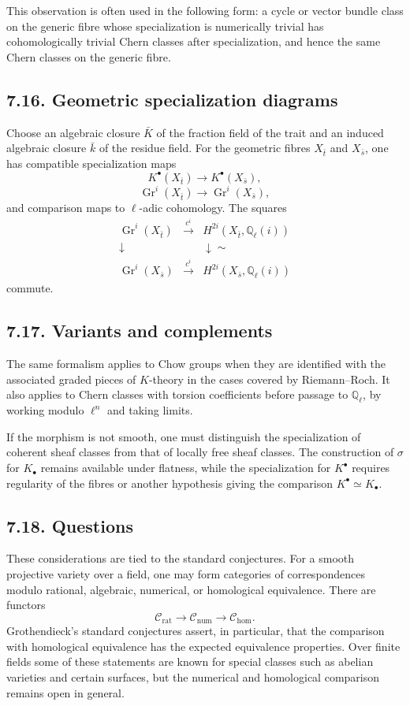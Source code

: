 \documentclass[12pt]{article}
\newcommand{\QQ}{\mathbb Q}
\newcommand{\Gr}{\operatorname{Gr}}
\newcommand{\xto}[1]{\xrightarrow{#1}}
\newcommand{\longto}{\longrightarrow}
\begin{document}
This observation is often used in the following form: a cycle or vector bundle class on the generic fibre whose specialization is numerically trivial has cohomologically trivial Chern classes after specialization, and hence the same Chern classes on the generic fibre.

\subsection*{7.16. Geometric specialization diagrams}

Choose an algebraic closure $\bar K$ of the fraction field of the trait and an induced algebraic closure $\bar k$ of the residue field. For the geometric fibres $X_{\bar t}$ and $X_{\bar s}$, one has compatible specialization maps
\[
K^\bullet(X_{\bar t})\longto K^\bullet(X_{\bar s}),
\]
\[
\Gr^i(X_{\bar t})\longto \Gr^i(X_{\bar s}),
\]
and comparison maps to $\ell$-adic cohomology. The squares
\[
\begin{array}{ccc}
\Gr^i(X_{\bar t})&\xto{\,c^i\,}&H^{2i}(X_{\bar t},\QQ_\ell(i))\\
\downarrow&&\downarrow\scriptstyle\sim\\
\Gr^i(X_{\bar s})&\xto{\,c^i\,}&H^{2i}(X_{\bar s},\QQ_\ell(i))
\end{array}
\]
commute.

\subsection*{7.17. Variants and complements}

The same formalism applies to Chow groups when they are identified with the associated graded pieces of $K$-theory in the cases covered by Riemann--Roch. It also applies to Chern classes with torsion coefficients before passage to $\QQ_\ell$, by working modulo $\ell^n$ and taking limits.

If the morphism is not smooth, one must distinguish the specialization of coherent sheaf classes from that of locally free sheaf classes. The construction of $\sigma$ for $K_\bullet$ remains available under flatness, while the specialization for $K^\bullet$ requires regularity of the fibres or another hypothesis giving the comparison $K^\bullet\simeq K_\bullet$.

\subsection*{7.18. Questions}

These considerations are tied to the standard conjectures. For a smooth projective variety over a field, one may form categories of correspondences modulo rational, algebraic, numerical, or homological equivalence. There are functors
\[
\mathcal C_{\mathrm{rat}}\longto\mathcal C_{\mathrm{num}}\longto\mathcal C_{\mathrm{hom}}.
\]
Grothendieck's standard conjectures assert, in particular, that the comparison with homological equivalence has the expected equivalence properties. Over finite fields some of these statements are known for special classes such as abelian varieties and certain surfaces, but the numerical and homological comparison remains open in general.
\end{document}
